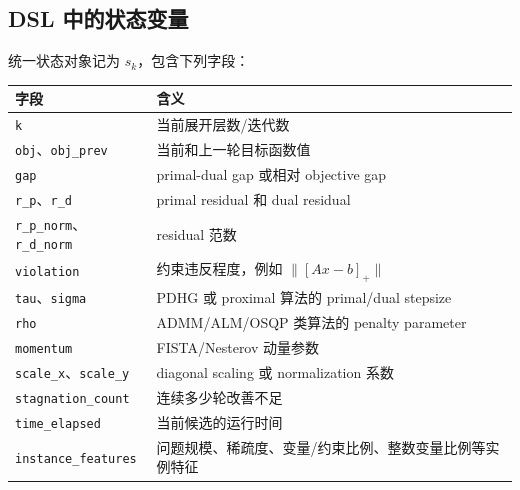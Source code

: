 \documentclass[12pt,a4paper]{ctexart}
\begin{document}
\subsection{DSL 中的状态变量}
统一状态对象记为 $s_k$，包含下列字段：
\begin{longtable}{p{}p{}}
\toprule
字段 & 含义 \\
\midrule
\texttt{k} & 当前展开层数/迭代数 \\
\texttt{obj}、\texttt{obj\_prev} & 当前和上一轮目标函数值 \\
\texttt{gap} & primal-dual gap 或相对 objective gap \\
\texttt{r\_p}、\texttt{r\_d} & primal residual 和 dual residual \\
\texttt{r\_p\_norm}、\texttt{r\_d\_norm} & residual 范数 \\
\texttt{violation} & 约束违反程度，例如 $\|[Ax-b]_+\|$ \\
\texttt{tau}、\texttt{sigma} & PDHG 或 proximal 算法的 primal/dual stepsize \\
\texttt{rho} & ADMM/ALM/OSQP 类算法的 penalty parameter \\
\texttt{momentum} & FISTA/Nesterov 动量参数 \\
\texttt{scale\_x}、\texttt{scale\_y} & diagonal scaling 或 normalization 系数 \\
\texttt{stagnation\_count} & 连续多少轮改善不足 \\
\texttt{time\_elapsed} & 当前候选的运行时间 \\
\texttt{instance\_features} & 问题规模、稀疏度、变量/约束比例、整数变量比例等实例特征 \\
\bottomrule
\end{longtable}
\end{document}
